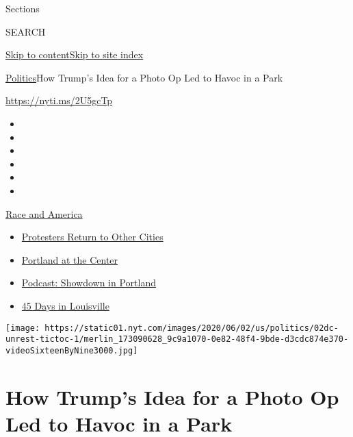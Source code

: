 Sections

SEARCH

\protect\hyperlink{site-content}{Skip to
content}\protect\hyperlink{site-index}{Skip to site index}

\href{/section/politics}{Politics}\textbar{}How Trump's Idea for a Photo
Op Led to Havoc in a Park

\url{https://nyti.ms/2U5gcTp}

\begin{itemize}
\item
\item
\item
\item
\item
\item
\end{itemize}

\href{https://www.nytimes.com/news-event/george-floyd-protests-minneapolis-new-york-los-angeles?action=click\&pgtype=Article\&state=default\&region=TOP_BANNER\&context=storylines_menu}{Race
and America}

\begin{itemize}
\tightlist
\item
  \href{https://www.nytimes.com/2020/07/26/us/protests-portland-seattle-trump.html?action=click\&pgtype=Article\&state=default\&region=TOP_BANNER\&context=storylines_menu}{Protesters
  Return to Other Cities}
\item
  \href{https://www.nytimes.com/2020/07/24/us/portland-oregon-protests-white-race.html?action=click\&pgtype=Article\&state=default\&region=TOP_BANNER\&context=storylines_menu}{Portland
  at the Center}
\item
  \href{https://www.nytimes.com/2020/07/23/podcasts/the-daily/portland-protests.html?action=click\&pgtype=Article\&state=default\&region=TOP_BANNER\&context=storylines_menu}{Podcast:
  Showdown in Portland}
\item
  \href{https://www.nytimes.com/interactive/2020/07/16/us/black-lives-matter-protests-louisville-breonna-taylor.html?action=click\&pgtype=Article\&state=default\&region=TOP_BANNER\&context=storylines_menu}{45
  Days in Louisville}
\end{itemize}

\texttt{[image: https://static01.nyt.com/images/2020/06/02/us/politics/02dc-unrest-tictoc-1/merlin\_173090628\_9c9a1070-0e82-48f4-9bde-d3cdc874e370-videoSixteenByNine3000.jpg]}

\hypertarget{how-trumps-idea-for-a-photo-op-led-to-havoc-in-a-park}{%
\section{How Trump's Idea for a Photo Op Led to Havoc in a
Park}\label{how-trumps-idea-for-a-photo-op-led-to-havoc-in-a-park}}

